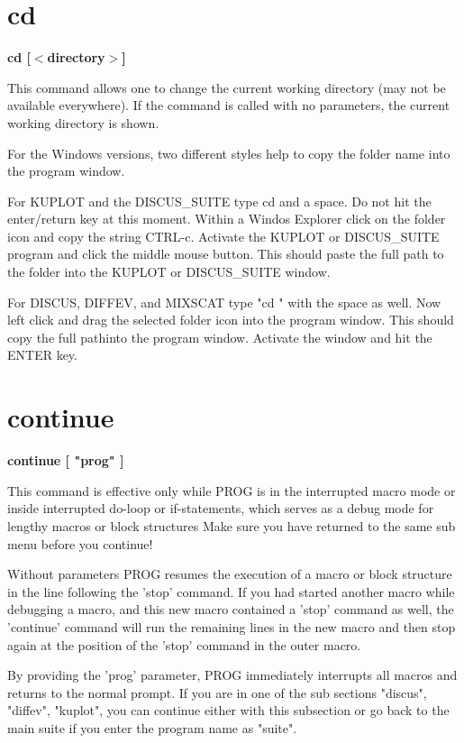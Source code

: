 \section{cd}
{\bf cd [$ <$directory$> $] \par }
\par
\vspace{3pt}
This command allows one to change the current working directory 
(may not be available everywhere). If the command is called with 
no parameters, the current working directory is shown. 
\par
For the Windows versions, two different styles help to copy the 
folder name into the program window. 
\par
For KUPLOT and the DISCUS\_SUITE type 
cd 
and a space. Do not hit the enter/return key at this moment. 
Within a Windos Explorer click on the folder icon and copy the 
string CTRL-c. Activate the KUPLOT or DISCUS\_SUITE program and 
click the middle mouse button. This should paste the full path 
to the folder into the KUPLOT or DISCUS\_SUITE window. 
\par
For DISCUS, DIFFEV, and MIXSCAT type "cd " with the space as well. 
Now left click and drag the selected folder icon into the program 
window. This should copy the full pathinto the program window. 
Activate the window and hit the ENTER key. 
\section{continue}
{\bf continue [ "prog" ] \par }
\par
\vspace{3pt}
This command is effective only while PROG is in the interrupted 
macro mode or inside interrupted do-loop or if-statements, which serves 
as a debug mode for lengthy macros or block structures 
Make sure you have returned to the same sub menu before you continue! 
\par
Without parameters PROG resumes the execution of a macro or block 
structure in the line following the 'stop' command. If you 
had started another macro while debugging a macro, and this new macro 
contained a 'stop' command as well, the 'continue' command will run 
the remaining lines in the new macro and then stop again at the position 
of the 'stop' command in the outer macro. 
\par
By providing the 'prog' parameter, PROG immediately interrupts all 
macros and returns to the normal prompt. 
If you are in one of the sub sections "discus", "diffev", "kuplot", 
you can continue either with this subsection or go back to the main 
suite if you enter the program name as "suite". 
